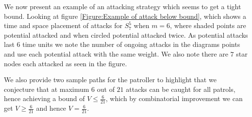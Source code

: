 \documentclass[a4paper,10pt]{article}
\theoremstyle{definition}
\theoremstyle{definition}
\theoremstyle{remark}
\theoremstyle{definition}
\begin{document}
We now present an example of an attacking strategy which seems to get a tight bound. Looking at figure \ref{Figure:Example of attack below bound}, which shows a time and space placement of attacks for $S_{7}^{5}$ when $m=6$, where shaded points are potential attacked and when circled potential attacked twice. As potential attacks last $6$ time units we note the number of ongoing attacks in the diagrams points and use each potential attack with the same weight. We also note there are $7$ star nodes each attacked as seen in the figure.


We also provide two sample paths for the patroller to highlight that we conjecture that at maximum $6$ out of $21$ attacks can be caught for all patrols, hence achieving a bound of $V \leq \frac{6}{21}$, which by combinatorial improvement we can get $V \geq \frac{6}{21}$ and hence $V=\frac{6}{21}$.
\end{document}
